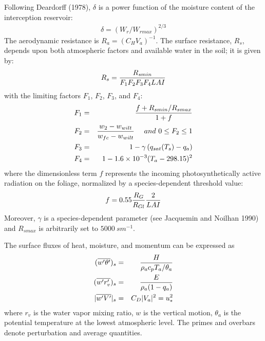 Following Deardorff (1978), $\delta$ is a power function of the
moisture content of the interception reservoir:
\begin{eqnarray}
\delta = (W_r / W_{rmax})^{2/3}
\end{eqnarray}
The aerodynamic resistance is $R_a = ( C_H V_a )^{-1}$.
The surface resistance, $R_s$, depends upon both atmospheric
factors and available water in the soil; it is given by:
\begin{eqnarray}
R_s = {R_{smin} \over F_1 F_2 F_3 F_4 LAI}
\end{eqnarray}
with the limiting factors $F_1$, $F_2$, $F_3$, and $F_4$:
\begin{eqnarray}
F_1 &=& {f+R_{smin}/R_{smax} \over 1+f} \\
F_2 &=& {w_2-w_{wilt} \over w_{fc} - w_{wilt} } \ \ \ \
and \ 0 \leq F_2 \leq 1 \\
F_3 &=& 1 - \gamma \left( q_{sat}(T_s) - q_a \right) \\
F_4 &=& 1-1.6\times 10^{-3} (T_a - 298.15)^2
\end{eqnarray}
where the dimensionless term $f$ represents the incoming
photosynthetically active radiation on the foliage,
normalized by a species-dependent threshold value:
\begin{eqnarray}
f = 0.55 {R_G \over R_{Gl}} {2 \over LAI}
\end{eqnarray}
Moreover,
$\gamma$ is a species-dependent parameter (see Jacquemin and
Noilhan 1990) and $R_{smax}$ is arbitrarily set to $5000 \ s m^{-1}$.

The surface fluxes of heat, moisture, and momentum can
be expressed as
\begin{eqnarray}
(\overline{w'\theta'})_s &=& {H \over \rho_a c_p T_a / \theta_a} \label{eqn_H} \\
(\overline{w'r'_v})_s &=& {E \over \rho_a (1-q_a)} \label{eqn_LE} \\
|\overline{w'V'}|_s &=& C_D |V_a|^2  = u^2_* \label{eqn_FM}
\end{eqnarray}
where $r_v$ is the water vapor mixing ratio,
$w$ is the vertical motion, $\theta_a$ is the potential
temperature at the lowest atmospheric level.  The primes and
overbars denote perturbation and average quantities.

